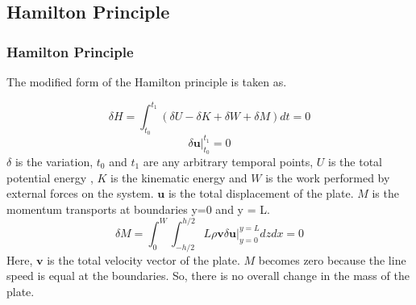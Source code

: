 \documentclass[9pt]{beamer}
\begin{document}
\subsection{Hamilton Principle}


\begin{frame}\frametitle{Hamilton Principle}

The modified form of the Hamilton principle is taken as.

 \begin{equation}\label{eq:HAM_P}
 \delta H=\int_{t_0}^{t_1} \left( \delta U - \delta K + \delta W + \delta M \right) dt  = 0  
 \end{equation}
 \begin{equation}\label{eq:HAM_P_C}
  \delta \mathbf{u} \Big|_{t_0}^{t_1} = 0
 \end{equation}
 $\delta$ is the variation, $t_0$ and $t_1$ are any arbitrary temporal points, $U$ is the total potential energy , $K$ is the kinematic energy and $W$ is the work performed by external forces on the system. $\mathbf{u}$ is the total displacement of the plate. $M$ is the momentum transports at boundaries y=0 and y = L. 
 \begin{equation}\label{eq:vr_M}
\delta M= \int_{0}^{W} \int_{-h/2}^{h/2}L \rho \mathbf{v} \delta \mathbf{u} \Big|_{y=0}^{y=L} dz dx  = 0
 \end{equation}
Here, $\mathbf{v}$ is the total velocity vector of the plate. $M$ becomes zero because the line speed is equal at the boundaries. So, there is no overall change in the mass of the plate.
\end{frame}
\end{document}
